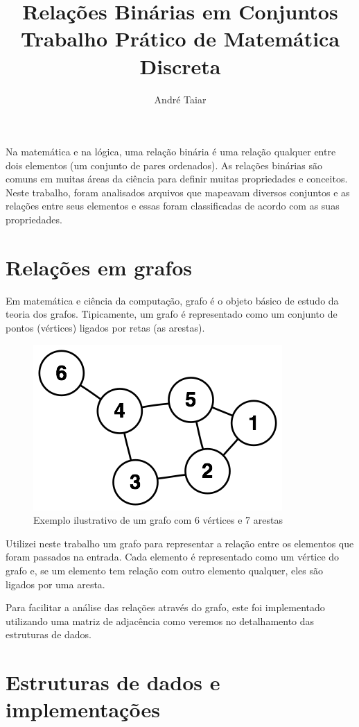 \documentclass[12pt]{article}
\title{Relações Binárias em Conjuntos\\Trabalho Prático de Matemática Discreta}
\author{André Taiar\inst{1}}
\begin{document}
\maketitle

\begin{resumo}
  Na matemática e na lógica, uma relação binária é uma relação qualquer entre
  dois elementos (um conjunto de pares ordenados). As relações binárias são comuns
  em muitas áreas da ciência para definir muitas propriedades e conceitos. Neste
  trabalho, foram analisados arquivos que mapeavam diversos conjuntos e as
  relações entre seus elementos e essas foram classificadas de acordo com as
  suas propriedades.
\end{resumo}


\section{Relações em grafos} %

Em matemática e ciência da computação, grafo é o objeto básico de estudo da
teoria dos grafos. Tipicamente, um grafo é representado como um conjunto de
pontos (vértices) ligados por retas (as arestas).

\begin{figure}[ht]
\centering
\includegraphics[width=.5\textwidth]{grafoEx.png}
\caption{Exemplo ilustrativo de um grafo com 6 vértices e 7 arestas}
\label{fig:exampleFig1}
\end{figure}

Utilizei neste trabalho um grafo para representar a relação entre os elementos
que foram passados na entrada. Cada elemento é representado como um vértice do
grafo e, se um elemento tem relação com outro elemento qualquer, eles são ligados
por uma aresta.

Para facilitar a análise das relações através do grafo, este foi implementado
utilizando uma matriz de adjacência como veremos no detalhamento das estruturas de
dados.

\section{Estruturas de dados e implementações}
\end{document}
